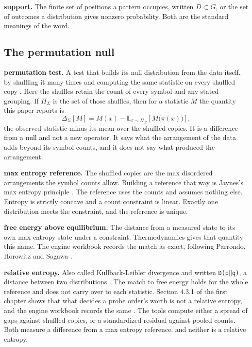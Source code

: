 \noindent\textbf{support.} The finite set of positions a pattern occupies, written \(D \subset G\), or the set of outcomes a distribution gives nonzero probability. Both are the standard meanings of the word.

\subsection{The permutation null}

\noindent\textbf{permutation test.} A test that builds its null distribution from the data itself, by shuffling it many times and computing the same statistic on every shuffled copy \cite{src:Good-2005}. Here the shuffles retain the count of every symbol and any stated grouping. If \(\Pi_\Sigma\) is the set of those shuffles, then for a statistic \(M\) the quantity this paper reports is
\[
\Delta_\Sigma[M] = M(x) - \mathbb{E}_{\pi \sim \Pi_\Sigma}\!\left[M\bigl(\pi(x)\bigr)\right],
\]
the observed statistic minus its mean over the shuffled copies. It is a difference from a null and not a new operator. It says what the arrangement of the data adds beyond its symbol counts, and it does not say what produced the arrangement.

\noindent\textbf{max entropy reference.} The shuffled copies are the max disordered arrangements the symbol counts allow. Building a reference that way is Jaynes's max entropy principle \cite{src:Jaynes}. The reference uses the counts and assumes nothing else. Entropy is strictly concave and a count constraint is linear. Exactly one distribution meets the constraint, and the reference is unique.

\noindent\textbf{free energy above equilibrium.} The distance from a measured state to its own max entropy state under a constraint. Thermodynamics gives that quantity this name. The engine workbook \cite{src:Quigg-orior-workbook} records the match as exact, following Parrondo, Horowitz and Sagawa \cite{src:Parrondo}.

\noindent\textbf{relative entropy.} Also called Kullback-Leibler divergence and written \texttt{D(p‖q)}, a distance between two distributions \cite{src:Kullback}. The match to free energy holds for the whole reference and does not carry over to each statistic. Section 4.3.1 of the first chapter shows that what decides a probe order's worth is not a relative entropy, and the engine workbook records the same \cite{src:Quigg-orior-workbook}. The tools compute either a spread of gaps against shuffled copies, or a standardized residual against pooled counts. Both measure a difference from a max entropy reference, and neither is a relative entropy.


